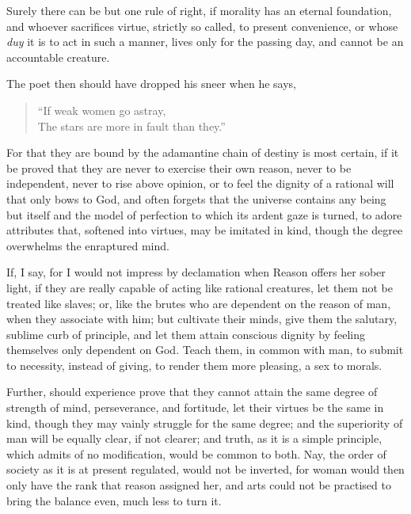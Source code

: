 Surely there can be but one rule of right, if morality has an eternal
foundation, and whoever sacrifices virtue, strictly so called, to
present convenience, or whose \textit{duy} it is to act in such a
manner, lives only for the passing day, and cannot be an accountable
creature.

The poet then should have dropped his sneer when he says,


\begin{verse}
``If weak women go astray,\\
The stars are more in fault than they.''
\end{verse}

\noindent For that they are bound by the adamantine chain of destiny
is most certain, if it be proved that they are never to exercise their
own reason, never to be independent, never to rise  above
opinion, or to feel the dignity of a rational will that only bows to
God, and often forgets that the universe contains any being but itself
and the model of perfection to which its ardent gaze is turned, to
adore attributes that, softened into virtues, may be imitated in kind,
though the degree overwhelms the enraptured mind.

If, I say, for I would not impress by declamation when Reason offers
her sober light, if they are really capable of acting like rational
creatures, let them not be treated like slaves; or, like the brutes
who are dependent on the reason of man, when they associate with him;
but cultivate their minds, give them the salutary, sublime curb of
principle, and let them attain conscious dignity by feeling themselves
only dependent on God. Teach them, in common with man, to submit to
necessity, instead of giving, to render them more pleasing, a sex to
morals.

Further, should experience prove that they cannot attain the same
degree of strength of mind, perseverance, and fortitude, let their
virtues be the same in kind, though they may vainly struggle for the
same degree; and the superiority of man will be equally clear, if not
 clearer; and truth, as it is a simple principle, which
admits of no modification, would be common to both. Nay, the order of
society as it is at present regulated, would not be inverted, for
woman would then only have the rank that reason assigned her, and arts
could not be practised to bring the balance even, much less to turn
it.

